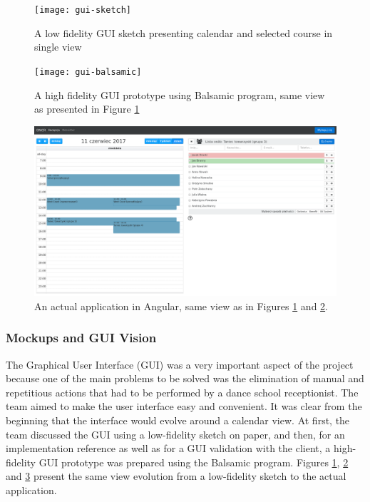 \documentclass{article}
\begin{document}
\begin{figure}[h]
    \texttt{[image: gui-sketch]}
    \caption{A low fidelity GUI sketch presenting calendar and selected course in single view}
    \label{fig:gui-sketch}
\end{figure}
\begin{figure}[h]
    \texttt{[image: gui-balsamic]}
    \caption{A high fidelity GUI prototype using Balsamic program, same view as presented in Figure \ref{fig:gui-sketch}}
    \label{fig:gui-balsamic}
\end{figure}
\begin{figure}[h]
    \includegraphics[width=\textwidth]{gui-angular}
    \caption{An actual application in Angular, same view as in Figures \ref{fig:gui-sketch} and \ref{fig:gui-balsamic}.} 
    \label{fig:gui-angular}
\end{figure}

\subsubsection{Mockups and GUI Vision}
The Graphical User Interface (GUI) was a very important aspect of the project because one of the main problems to be solved was the elimination of manual and repetitious actions that had to be performed by a dance school receptionist. The team aimed to make the user interface easy and convenient. It was clear from the beginning that the interface would evolve around a calendar view. At first, the team discussed the GUI using a low-fidelity sketch on paper, and then, for an implementation reference as well as for a GUI validation with the client, a high-fidelity GUI prototype was prepared using the Balsamic program. Figures \ref{fig:gui-sketch}, \ref{fig:gui-balsamic} and \ref{fig:gui-angular} present the same view evolution from a low-fidelity sketch to the actual application.
\end{document}
